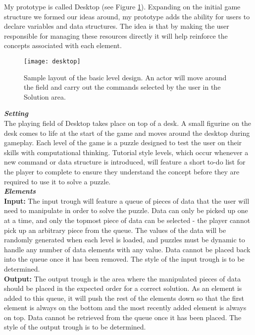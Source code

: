 My prototype is called Desktop (see Figure \ref{fig:desktop}). Expanding on the initial game structure we formed 
our ideas around, my prototype adds the ability for users to declare variables and data structures. The idea 
is that by making the user responsible for managing these resources directly it will help reinforce the concepts 
associated with each element.\\

\begin{figure}[!hb]
	\centering
	\texttt{[image: desktop]}
	\caption{Sample layout of the basic level design. An actor will move around the field and carry out the commands selected by the user in the Solution area.}
	\label{fig:desktop}
\end{figure}

\textbf{\textit{Setting}}\\
The playing field of Desktop takes place on top of a desk. A small figurine on the desk comes to life at the start 
of the game and moves around the desktop during gameplay. Each level of the game is a puzzle designed to 
test the user on their skills with computational thinking. Tutorial style levels, which occur whenever a new 
command or data structure is introduced, will feature a short to-do list for the player to complete to ensure they
 understand the concept before they are required to use it to solve a puzzle.\\

\textbf{\textit{Elements}}\\
\textbf{Input:}
The input trough will feature a queue of pieces of data that the user will need to manipulate in order to solve 
the puzzle. Data can only be picked up one at a time, and only the topmost piece of data can be selected - the 
player cannot pick up an arbitrary piece from the queue. The values of the data will be randomly generated 
when each level is loaded, and puzzles must be dynamic to handle any number of data elements with any value. 
Data cannot be placed back into the queue once it has been removed. The style of the input trough is to be 
determined.\\

\textbf{Output:}
The output trough is the area where the manipulated pieces of data should be placed in the expected order 
for a correct solution. As an element is added to this queue, it will push the rest of the elements down so that 
the first element is always on the bottom and the most recently added element is always on top. Data cannot 
be retrieved from the queue once it has been placed. The style of the output trough is to be determined.\\

